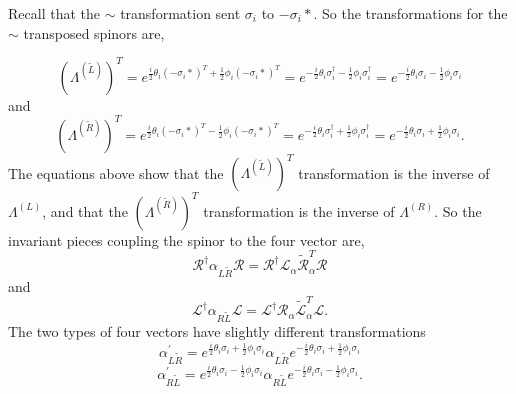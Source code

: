 \documentclass[12pt]{article}
\begin{document}
Recall that the $\sim$ transformation sent $\sigma_i$ to $-\sigma_i*$. So the transformations for the $\sim$ transposed spinors are,

\begin{equation}
(\Lambda^{(\tilde{L})})^T = e^{\frac{i}{2}\theta_i(-\sigma_i*)^T + \frac{1}{2}\phi_i (-\sigma_i*)^T} 
= e^{-\frac{i}{2}\theta_i \sigma_i^\dagger - \frac{1}{2}\phi_i \sigma_i^\dagger} = e^{-\frac{i}{2}\theta_i \sigma_i - \frac{1}{2}\phi_i \sigma_i}
\end{equation}
and
\begin{equation}
(\Lambda^{(\tilde{R})})^T = e^{\frac{i}{2}\theta_i(-\sigma_i*)^T - \frac{1}{2}\phi_i (-\sigma_i*)^T} 
= e^{-\frac{i}{2}\theta_i \sigma_i^\dagger + \frac{1}{2}\phi_i \sigma_i^\dagger} = e^{-\frac{i}{2}\theta_i \sigma_i + \frac{1}{2}\phi_i \sigma_i}.
\end{equation}
The equations above show that the $(\Lambda^{(\tilde{L})})^T$ transformation is the inverse of $\Lambda^{(L)}$, and that the $(\Lambda^{(\tilde{R})})^T$ transformation is the inverse of $\Lambda^{(R)}$. So the invariant pieces coupling the spinor to the four vector are,
\begin{equation}
\mathcal{R}^\dagger \alpha_{L\tilde{R}} \mathcal{R} = \mathcal{R}^\dagger \mathcal{L}_\alpha \tilde{\mathcal{R}}_\alpha^{T} \mathcal{R}
\end{equation}
and
\begin{equation}
\mathcal{L}^\dagger \alpha_{R\tilde{L}} \mathcal{L} = \mathcal{L}^\dagger \mathcal{R}_\alpha \tilde{\mathcal{L}}_\alpha^{T} \mathcal{L}.
\end{equation}
The two types of four vectors have slightly different transformations
\begin{equation}
\alpha_{L\tilde{R}}^{'} = e^{\frac{i}{2}\theta_i \sigma_i + \frac{1}{2}\phi_i \sigma_i} 
\alpha_{L\tilde{R}} e^{-\frac{i}{2}\theta_i \sigma_i + \frac{1}{2}\phi_i \sigma_i}
\end{equation}
\begin{equation}
\alpha_{R\tilde{L}}^{'} = e^{\frac{i}{2}\theta_i \sigma_i - \frac{1}{2}\phi_i \sigma_i} 
\alpha_{R\tilde{L}} e^{-\frac{i}{2}\theta_i \sigma_i - \frac{1}{2}\phi_i \sigma_i}.
\end{equation}
\end{document}

